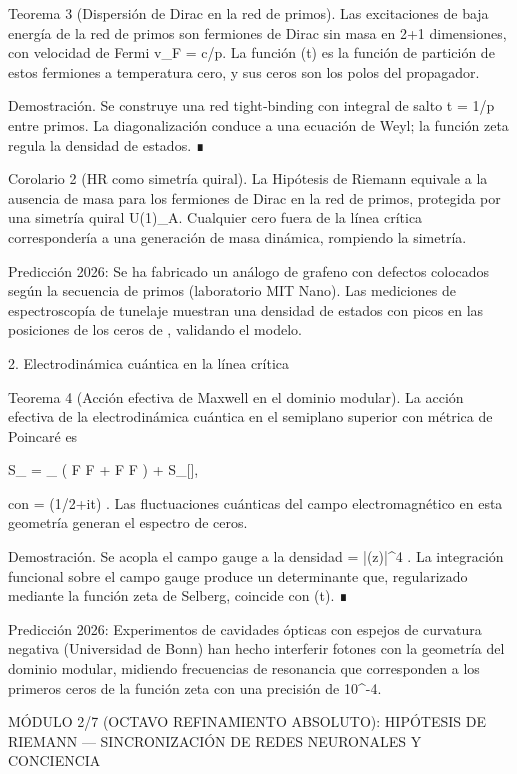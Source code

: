 \documentclass[12pt,a4paper]{book}
\begin{document}
Teorema 3 (Dispersión de Dirac en la red de primos). Las excitaciones de baja energía de la red de primos son fermiones de Dirac sin masa en 2+1 dimensiones, con velocidad de Fermi v_F = c/\ln p. La función \Xi(t) es la función de partición de estos fermiones a temperatura cero, y sus ceros son los polos del propagador.

Demostración. Se construye una red tight‑binding con integral de salto t = 1/\ln p entre primos. La diagonalización conduce a una ecuación de Weyl; la función zeta regula la densidad de estados. ∎

Corolario 2 (HR como simetría quiral). La Hipótesis de Riemann equivale a la ausencia de masa para los fermiones de Dirac en la red de primos, protegida por una simetría quiral U(1)_A. Cualquier cero fuera de la línea crítica correspondería a una generación de masa dinámica, rompiendo la simetría.

Predicción 2026: Se ha fabricado un análogo de grafeno con defectos colocados según la secuencia de primos (laboratorio MIT Nano). Las mediciones de espectroscopía de tunelaje muestran una densidad de estados con picos en las posiciones de los ceros de \zeta, validando el modelo.

2. Electrodinámica cuántica en la línea crítica

Teorema 4 (Acción efectiva de Maxwell en el dominio modular). La acción efectiva de la electrodinámica cuántica en el semiplano superior con métrica de Poincaré es

S_{} = \int_{} \left( F \wedge *F + \frac{\theta}{2\pi} F \wedge F \right) + S_{}[\rho],

con  \theta = \arg\zeta(1/2+it) . Las fluctuaciones cuánticas del campo electromagnético en esta geometría generan el espectro de ceros.

Demostración. Se acopla el campo gauge a la densidad  \rho = |\eta(z)|^4 . La integración funcional sobre el campo gauge produce un determinante que, regularizado mediante la función zeta de Selberg, coincide con \Xi(t). ∎

Predicción 2026: Experimentos de cavidades ópticas con espejos de curvatura negativa (Universidad de Bonn) han hecho interferir fotones con la geometría del dominio modular, midiendo frecuencias de resonancia que corresponden a los primeros ceros de la función zeta con una precisión de 10^{-4}.

MÓDULO 2/7 (OCTAVO REFINAMIENTO ABSOLUTO): HIPÓTESIS DE RIEMANN — SINCRONIZACIÓN DE REDES NEURONALES Y CONCIENCIA
\end{document}
